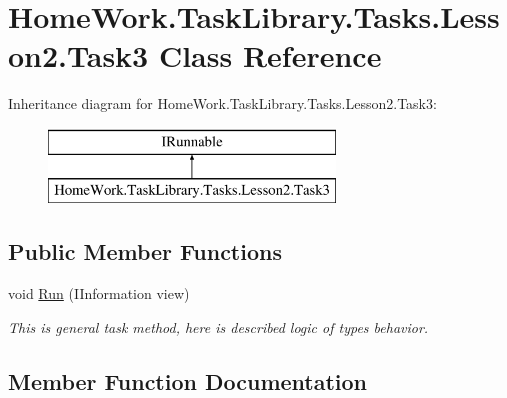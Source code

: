 \hypertarget{class_home_work_1_1_task_library_1_1_tasks_1_1_lesson2_1_1_task3}{}\section{Home\+Work.\+Task\+Library.\+Tasks.\+Lesson2.\+Task3 Class Reference}
\label{class_home_work_1_1_task_library_1_1_tasks_1_1_lesson2_1_1_task3}
Inheritance diagram for Home\+Work.\+Task\+Library.\+Tasks.\+Lesson2.\+Task3\+:\begin{figure}[H]
\begin{center}
\leavevmode
\includegraphics[height=2.000000cm]{class_home_work_1_1_task_library_1_1_tasks_1_1_lesson2_1_1_task3}
\end{center}
\end{figure}
\subsection*{Public Member Functions}
\begin{DoxyCompactItemize}
\item 
void \mbox{\hyperlink{class_home_work_1_1_task_library_1_1_tasks_1_1_lesson2_1_1_task3_a8cd4914844134c9415850ff9066b8382}{Run}} (I\+Information view)
\begin{DoxyCompactList}\small\item\em This is general task method, here is described logic of types behavior. \end{DoxyCompactList}\end{DoxyCompactItemize}


\subsection{Member Function Documentation}
\mbox{\label{class_home_work_1_1_task_library_1_1_tasks_1_1_lesson2_1_1_task3_a8cd4914844134c9415850ff9066b8382}} 
